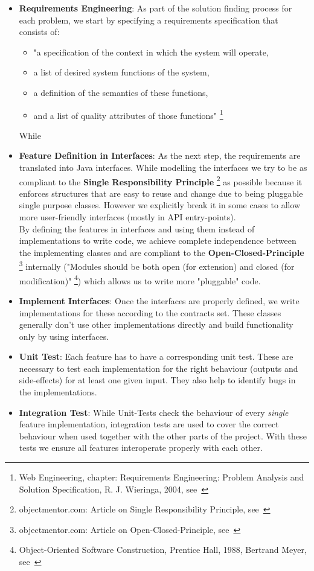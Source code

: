 \begin{itemize}
	\item \textbf{Requirements Engineering}: As part of the solution finding process for each problem, we start by specifying a requirements specification that consists of:
	\begin{itemize}
		\item "a specification of the context in which the system will operate,
		\item a list of desired system functions of the system,
		\item a definition of the semantics of these functions,
		\item and a list of quality attributes of those functions" \footnote{Web Engineering, chapter: Requirements Engineering: Problem Analysis and Solution Specification, R. J. Wieringa, 2004, see~\cite{requirements_engineering}}
	\end{itemize}
	While 
	\item \textbf{Feature Definition in Interfaces}: As the next step, the requirements are translated into Java interfaces.	While modelling the interfaces we try to be as compliant to the \textbf{Single Responsibility Principle} \footnote{objectmentor.com: Article on Single Responsibility Principle, see~\cite{singleresponsibility_objectmentor}} as possible because it enforces structures that are easy to reuse and change due to being pluggable single purpose classes. However we explicitly break it in some cases to allow more user-friendly interfaces (mostly in API entry-points).
	\\
	By defining the features in interfaces and using them instead of implementations to write code, we achieve complete independence between the implementing classes and are compliant to the \textbf{Open-Closed-Principle} \footnote{	objectmentor.com: Article on Open-Closed-Principle, see~\cite{openclosed_objectmentor}} internally ("Modules should be both open (for extension) and closed (for modification)" \footnote{Object-Oriented Software Construction, Prentice Hall, 1988, Bertrand Meyer, see~\cite{openclosed_bertrand}}) which allows us to write more "pluggable" code.
	\item \textbf{Implement Interfaces}: Once the interfaces are properly defined, we write implementations for these according to the contracts set. These classes generally don't use other implementations directly and build functionality only by using interfaces.
	\item \textbf{Unit Test}: Each feature has to have a corresponding unit test. These are necessary to test each implementation for the right behaviour (outputs and side-effects) for at least one given input. They also help to identify bugs in the implementations.
	\item \textbf{Integration Test}: While Unit-Tests check the behaviour of every \textit{single} feature implementation, integration tests are used to cover the correct behaviour when used together with the other parts of the project. With these tests we ensure all features interoperate properly with each other.
\end{itemize}
